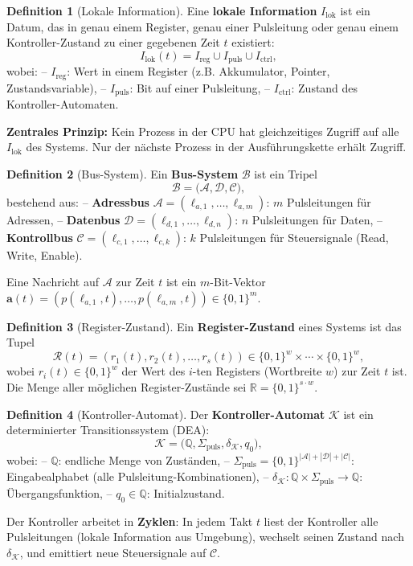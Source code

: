 \documentclass[a4paper,12pt]{article}
\theoremstyle{definition}
\newtheorem{definition}{Definition}
\begin{document}
\begin{definition}[Lokale Information]
	Eine \textbf{lokale Information} $I_{\text{lok}}$ ist ein Datum, das in genau einem Register, genau einer Pulsleitung oder genau einem Kontroller-Zustand zu einer gegebenen Zeit $t$ existiert:
	\[
	I_{\text{lok}}(t) = I_{\text{reg}} \cup I_{\text{puls}} \cup I_{\text{ctrl}},
	\]
	wobei:
	-- $I_{\text{reg}}$: Wert in einem Register (z.B. Akkumulator, Pointer, Zustandsvariable),
	-- $I_{\text{puls}}$: Bit auf einer Pulsleitung,
	-- $I_{\text{ctrl}}$: Zustand des Kontroller-Automaten.
	
	\textbf{Zentrales Prinzip:} Kein Prozess in der CPU hat gleichzeitiges Zugriff auf alle $I_{\text{lok}}$ des Systems. Nur der nächste Prozess in der Ausführungskette erhält Zugriff.
\end{definition}

\begin{definition}[Bus-System]
	Ein \textbf{Bus-System} $\mathcal{B}$ ist ein Tripel
	\[
	\mathcal{B} = \bigl(\mathcal{A}, \mathcal{D}, \mathcal{C}\bigr),
	\]
	bestehend aus:
	-- \textbf{Adressbus} $\mathcal{A} = (\ell_{a,1}, \ldots, \ell_{a,m})$: $m$ Pulsleitungen für Adressen,
	-- \textbf{Datenbus} $\mathcal{D} = (\ell_{d,1}, \ldots, \ell_{d,n})$: $n$ Pulsleitungen für Daten,
	-- \textbf{Kontrollbus} $\mathcal{C} = (\ell_{c,1}, \ldots, \ell_{c,k})$: $k$ Pulsleitungen für Steuersignale (Read, Write, Enable).
	
	Eine Nachricht auf $\mathcal{A}$ zur Zeit $t$ ist ein $m$-Bit-Vektor $\mathbf{a}(t) = (p(\ell_{a,1}, t), \ldots, p(\ell_{a,m}, t)) \in \{0,1\}^m$.
\end{definition}

\begin{definition}[Register-Zustand]
	Ein \textbf{Register-Zustand} eines Systems ist das Tupel
	\[
	\mathcal{R}(t) = (r_1(t), r_2(t), \ldots, r_s(t)) \in \{0,1\}^{w} \times \cdots \times \{0,1\}^{w},
	\]
	wobei $r_i(t) \in \{0,1\}^{w}$ der Wert des $i$-ten Registers (Wortbreite $w$) zur Zeit $t$ ist. Die Menge aller möglichen Register-Zustände sei $\mathbb{R} = \{0,1\}^{s \cdot w}$.
\end{definition}

\begin{definition}[Kontroller-Automat]
	Der \textbf{Kontroller-Automat} $\mathcal{K}$ ist ein determinierter Transitionssystem (DEA):
	\[
	\mathcal{K} = \bigl(\mathbb{Q}, \Sigma_{\text{puls}}, \delta_{\mathcal{K}}, q_0\bigr),
	\]
	wobei:
	-- $\mathbb{Q}$: endliche Menge von Zuständen,
	-- $\Sigma_{\text{puls}} = \{0, 1\}^{|\mathcal{A}| + |\mathcal{D}| + |\mathcal{C}|}$: Eingabealphabet (alle Pulsleitung-Kombinationen),
	-- $\delta_{\mathcal{K}} : \mathbb{Q} \times \Sigma_{\text{puls}} \to \mathbb{Q}$: Übergangsfunktion,
	-- $q_0 \in \mathbb{Q}$: Initialzustand.
	
	Der Kontroller arbeitet in \textbf{Zyklen}: In jedem Takt $t$ liest der Kontroller alle Pulsleitungen (lokale Information aus Umgebung), wechselt seinen Zustand nach $\delta_{\mathcal{K}}$, und emittiert neue Steuersignale auf $\mathcal{C}$.
\end{definition}
\end{document}

